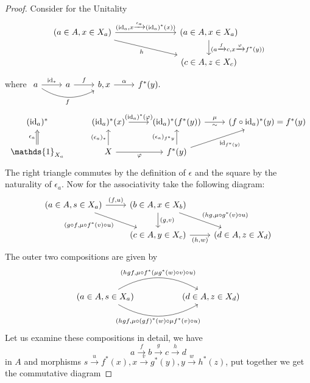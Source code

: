 \begin{proof}
	Consider for the Unitality
	\[
	\begin{tikzcd}
		( a \in A , x \in X_a )
		\ar[rrr, " { ( \id_a , x \xrightarrow{ \epsilon_a } ( \id_a )^* ( x ) ) } " ]
		\ar[rrrd, " h "' ]
		&&&
		( a \in A , x \in X_a )
		\ar[d, " { ( a \xrightarrow{ f } c , x \xrightarrow{ \varphi } f^* ( y ) ) } " ]
		\\
		&&&
		( c \in A , z \in X_c )
	\end{tikzcd}
	\]
	where
	$
	\begin{tikzcd}		
		a
		\ar[r, " \id_* "]
		\ar[rr, bend right, " f "' ]
		&
		a
		\ar[r, " f " ]
		&
		b , x
		\ar[r, " \alpha " ]
		&
		f^* ( y ).
	\end{tikzcd} 
	$
	\[
	\begin{tikzcd}
		( \id_a )^*
		&
		( \id_a )^* ( x )
		\ar[r , " ( \id_a )^* ( \varphi ) "]
		&
		( \id_a )^* ( f^* ( y ) )
		\ar[r, " \mu " , " \sim "']
		&
		( f \circ \id_a )^* ( y ) = f^* ( y )
		\\
		\mathds{ 1 }_{ X_a }
		\ar[ u , Rightarrow, " \epsilon_a " ]
		&
		X
		\ar[u, " ( \epsilon_a )_* "]
		\ar[r, " \varphi "' ]
		&
		f^* ( y ) 
		\ar[u, " { ( \epsilon_a )_{ f^* y } } " ]
		\ar[ru, " \id_{ f^* ( y ) } "' ]
	\end{tikzcd}
	\]
	The right triangle commutes by the definition of $ \epsilon $ and the square by the naturality of $ \epsilon_a $.
	Now for the associativity take the following diagram:
	\[
	\begin{tikzcd}	
		( a \in A , s \in X_a ) 
		\ar[r, " { ( f , u ) } " ]
		\ar[rd, " { ( g \circ f , \mu \circ f^* ( v ) \circ u ) } "' ]
		&
		( b \in A , x \in X_b )
		\ar[d, " {  ( g , v ) } "]
		\ar[rd, " { (  h g , \mu \circ g^* ( v ) \circ u ) } " ]
		\\
		&
		( c \in A , y \in X_c )
		\ar[r , " { ( h , w ) } "']
		&
		( d \in A , z \in X_d )
	\end{tikzcd}
	\]
	The outer two compositions are given by
	\[
	\begin{tikzcd}		
		( a \in A , s \in X_a )
		\ar[rr, bend left, "{ ( hgf , \mu \circ f^* ( \mu g^* ( w ) \circ v ) \circ u )}"]
		\ar[rr, bend right, "{ ( hgf, \mu \circ ( gf )^* ( w ) \circ \mu f^* ( v ) \circ u ) } "']
		&&
		( d \in A , z \in X_d )
	\end{tikzcd}
	\]
	Let us examine these compositions in detail, we have
	\[
		a \xrightarrow{f} b \xrightarrow{g} c \xrightarrow{h} d
	\]
	in $ A $
	and morphisms $ s \xrightarrow{u} f^* ( x ) , x \xrightarrow{v} g^* ( y ) , y \xrightarrow{w} h^* ( z ) $, put together we get the commutative diagram

\end{proof}
